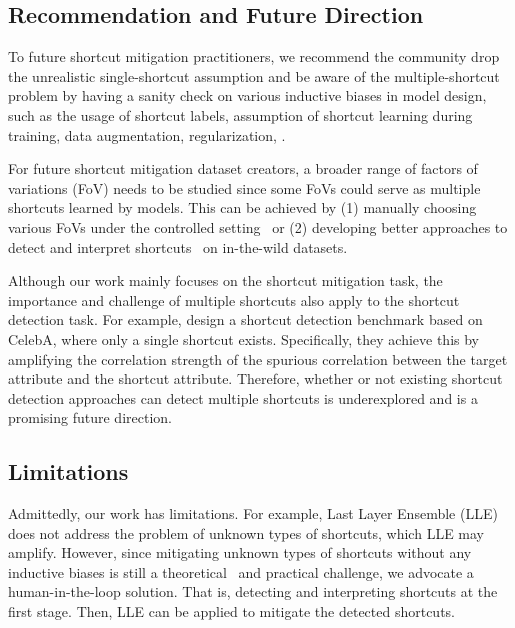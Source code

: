 \documentclass[10pt,twocolumn,letterpaper]{article}
\begin{document}
\subsection{Recommendation and Future Direction}

To future shortcut mitigation practitioners, we recommend the community drop the unrealistic single-shortcut assumption and be aware of the multiple-shortcut problem by having a sanity check on various inductive biases in model design, such as the usage of shortcut labels, assumption of shortcut learning during training, data augmentation, regularization, \etc.

For future shortcut mitigation dataset creators, a broader range of factors of variations (FoV) needs to be studied since some FoVs could serve as multiple shortcuts learned by models. This can be achieved by (1) manually choosing various FoVs under the controlled setting~\cite{leclerc20213DB,ibrahim2022Robustness,idrissi2022ImageNetX,barbu2019Adv.NeuralInf.Process.Syst.ObjectNet,eulig2021IEEECVFInt.Conf.Comput.Vis.ICCVDiagViB6,scimeca2022Int.Conf.Learn.Represent.Which} or (2) developing better approaches to detect and interpret shortcuts~\cite{li2021IEEECVFInt.Conf.Comput.Vis.ICCVDiscover,jain2022Distilling,eyuboglu2022Int.Conf.Learn.Represent.Domino,agarwal2022IEEECVFConf.Comput.Vis.PatternRecognit.CVPREstimating,bao2022ArXiv220413749CsLearning,deon2022ACMConf.FairnessAccount.Transpar.Spotlight,singla2021IEEECVFConf.Comput.Vis.PatternRecognit.CVPRUnderstanding} on in-the-wild datasets.

Although our work mainly focuses on the shortcut mitigation task, the importance and challenge of multiple shortcuts also apply to the shortcut detection task. For example, \citet{eyuboglu2022Int.Conf.Learn.Represent.Domino} design a shortcut detection benchmark based on CelebA, where only a single shortcut exists. Specifically, they achieve this by amplifying the correlation strength of the spurious correlation between the target attribute and the shortcut attribute. Therefore, whether or not existing shortcut detection approaches can detect multiple shortcuts is underexplored and is a promising future direction.

\subsection{Limitations}
Admittedly, our work has limitations.
For example, Last Layer Ensemble (LLE) does not address the problem of unknown types of shortcuts, which LLE may amplify. However, since mitigating unknown types of shortcuts without any inductive biases is still a theoretical~\cite{lin2022Adv.NeuralInf.Process.Syst.ZINa} and practical challenge, we advocate a human-in-the-loop solution. That is, detecting and interpreting shortcuts at the first stage. Then, LLE can be applied to mitigate the detected shortcuts.
\end{document}
